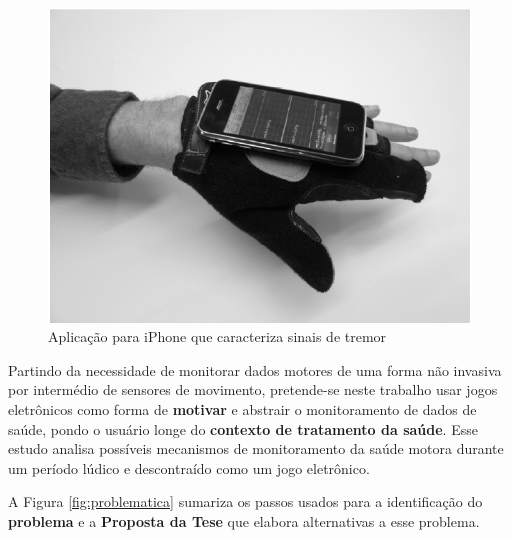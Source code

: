 \begin{figure}
 \centering
 \includegraphics[scale=0.3]{./img/moyne-iphone.png}
\caption[Aplicação para iPhone que caracteriza sinais de tremor]{Aplicação para iPhone que caracteriza sinais de tremor ~\cite{lemoyne2010}}
 \label{fig:iphone-tremor}
\end{figure}


Partindo da necessidade de monitorar dados motores de uma forma não invasiva por intermédio de sensores de movimento, pretende-se neste trabalho usar jogos eletrônicos como forma de \textbf{motivar} e abstrair o monitoramento de dados de saúde, pondo o usuário longe do \textbf{contexto de tratamento da saúde}. Esse estudo analisa possíveis mecanismos de monitoramento da saúde motora durante um período lúdico e descontraído como um jogo eletrônico.

A Figura \ref{fig:problematica} sumariza os passos usados para a identificação do \textbf{problema} e a \textbf{Proposta da Tese} que elabora alternativas a esse problema.

